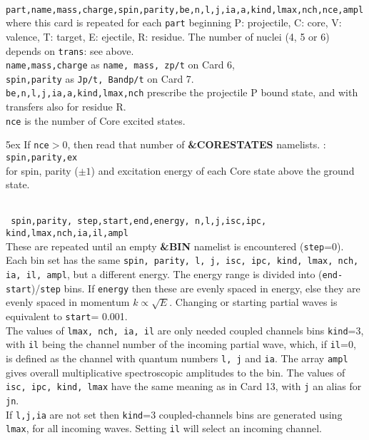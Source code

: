 \documentclass[11pt]{article}
\begin{document}
\\
{\tt part,name,mass,charge,spin,parity,be,n,l,j,ia,a,kind,lmax,nch,nce,ampl
}\\
where this card is repeated for each {\tt part} beginning P: projectile, C:
core, V: valence, T: target, E: ejectile, R: residue. The number of nuclei
(4, 5 or 6) depends on {\tt trans}: see above.\\
{\tt name,mass,charge} as {\tt name, mass, zp/t} on Card 6,\\
{\tt spin,parity} as {\tt Jp/t, Bandp/t} on Card 7.\\
{\tt be,n,l,j,ia,a,kind,lmax,nch} prescribe the projectile P bound state,
and with transfers also for residue R.\\
{\tt nce} is the number of Core excited states.

\hangindent 5ex
If {\tt nce}$>$0, then read that number of {\bf
\&CORESTATES} namelists. : {\tt
spin,parity,ex }\\ for spin, parity ($\pm1$) and excitation energy of each Core
state above the ground state.

\\
{\tt
spin,parity, step,start,end,energy, n,l,j,isc,ipc, kind,lmax,nch,ia,il,ampl
}\\
These are repeated until an empty  {\bf \&BIN} namelist is encountered
({\tt step}=0).\\
Each bin set has the same {\tt spin, parity, l, j, isc, ipc, kind, lmax, nch, ia,
il, ampl}, but a different energy.
The energy range is divided into ({\tt end-start})/{\tt step} bins.
If {\tt energy} then these are evenly spaced in energy, else they
are evenly spaced in momentum $k \propto \sqrt{E}$.
Changing or starting partial waves is equivalent to {\tt start}= 0.001.
\\
The values of {\tt lmax, nch, ia, il} are only needed coupled channels bins
{\tt kind}=3, with {\tt il} being the channel number of the incoming partial wave,
which, if {\tt il}=0, is defined as the channel with quantum numbers
{\tt l, j} and {\tt ia}. The array {\tt ampl} gives overall multiplicative
spectroscopic amplitudes to the bin. The values of {\tt isc, ipc, kind, lmax}
have the same meaning as in Card 13, with {\tt j} an alias for {\tt jn}.\\
If {\tt l,j,ia} are not set then {\tt kind}=3 coupled-channels bins are generated
using {\tt lmax}, for all incoming waves. Setting {\tt il} will select an
incoming channel.
\end{document}
